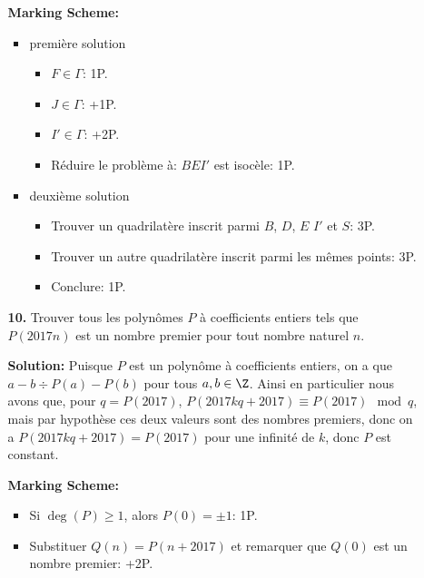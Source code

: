 \documentclass[language=german,style=solution]{smo}
\begin{document}
\begin{enumerate}
\begin{itemize}
\textbf{Marking Scheme:}
\begin{itemize}
\item première solution
\begin{itemize}
\item $F \in \Gamma$: \hfill 1P.
\item $J\in \Gamma$: \hfill +1P.
\item $I'\in \Gamma$: \hfill +2P.
\item Réduire le problème à: $BEI'$ est isocèle: \hfill 1P.
\end{itemize}
\item deuxième solution
\begin{itemize}
\item Trouver un quadrilatère inscrit parmi $B$, $D$, $E$ $I'$ et $S$: \hfill 3P.
\item Trouver un autre quadrilatère inscrit parmi les mêmes points: \hfill 3P.
\item Conclure: \hfill 1P.
\end{itemize}
%

\end{itemize}
\newpage

\item[\textbf{10.}] %
Trouver tous les polynômes $P$ à coefficients entiers tels que $P(2017n)$ est un nombre premier pour tout nombre naturel $n$.

\textbf{Solution:} Puisque $P$ est un polynôme à coefficients entiers, on a que $a-b\div P(a) - P(b)$ pour tous $a, b\in \Z$. Ainsi en particulier nous avons que, pour $q=P(2017)$,  $P(2017kq + 2017) \equiv P(2017) \mod {q}$, mais par hypothèse ces deux valeurs sont des nombres premiers, donc on a $P(2017kq + 2017) = P(2017)$ pour une infinité de $k$, donc $P$ est constant.

\textbf{Marking Scheme:}
\begin{itemize}
\item Si $\deg(P) \geq 1$, alors $P(0) = \pm 1$: \hfill 1P.
\item Substituer $Q(n) = P(n+2017)$ et remarquer que $Q(0)$ est un nombre premier: \hfill +2P.


\end{itemize}
\end{itemize}
\end{enumerate}
\end{document}
